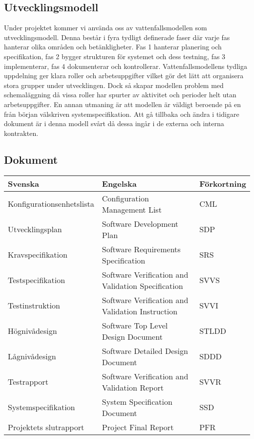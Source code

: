 \documentclass[paper=a4, fontsize=11pt,twoside]{article}
\begin{document}
\subsection*{Utvecklingsmodell}
Under projektet kommer vi använda oss av vattenfallsmodellen som utvecklingsmodell. Denna består i fyra tydligt definerade faser där varje fas hanterar olika områden och betänkligheter. Fas 1 hanterar planering och specifikation, fas 2 bygger strukturen för systemet och dess testning, fas 3 implementerar, fas 4 dokumenterar och kontrollerar.
Vattenfallsmodellens tydliga uppdelning ger klara roller och arbetsuppgifter vilket gör det lätt att organisera stora grupper under utvecklingen. Dock så skapar modellen problem med schemaläggning då vissa roller har spurter av aktivitet och perioder helt utan arbetsuppgifter. En annan utmaning är att modellen är väldigt beroende på en från början välskriven systemspecifikation. Att gå tillbaka och ändra i tidigare dokument är i denna modell svårt då dessa ingår i de externa och interna kontrakten.

\subsection*{Dokument}

\begin{tabular}{| l | l | l |}
\hline
\textbf{Svenska} & \textbf{Engelska} & \textbf{Förkortning} \\
\hline
\hline
 Konfigurationsenhetslista & Configuration Management List & CML \\
 \hline
Utvecklingsplan	 & Software Development Plan & SDP \\
\hline
Kravspecifikation & Software Requirements Specification & SRS \\
\hline
Testspecifikation & Software Verification and Validation Specification & SVVS \\
\hline
Testinstruktion & Software Verification and Validation Instruction & SVVI \\
\hline
Högnivådesign & Software Top Level Design Document & STLDD \\
\hline
Lågnivådesign & Software Detailed Design Document & SDDD \\
\hline
Testrapport & Software Verification and Validation Report & SVVR \\
\hline
Systemspecifikation & System Specification Document & SSD \\
\hline
Projektets slutrapport & Project Final Report & PFR \\
\hline
\end{tabular}\\
\end{document}

